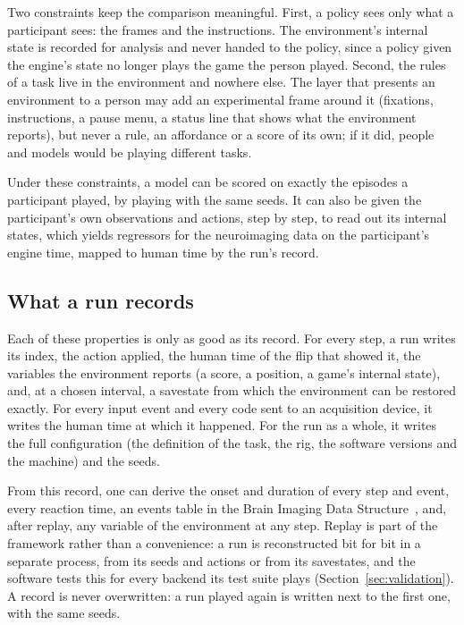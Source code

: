 Two constraints keep the comparison meaningful.
First, a policy sees only what a participant sees: the frames and the instructions.
The environment's internal state is recorded for analysis and never handed to the policy, since a policy given the engine's state no longer plays the game the person played.
Second, the rules of a task live in the environment and nowhere else.
The layer that presents an environment to a person may add an experimental frame around it (fixations, instructions, a pause menu, a status line that shows what the environment reports), but never a rule, an affordance or a score of its own; if it did, people and models would be playing different tasks.

Under these constraints, a model can be scored on exactly the episodes a participant played, by playing with the same seeds.
It can also be given the participant's own observations and actions, step by step, to read out its internal states, which yields regressors for the neuroimaging data on the participant's engine time, mapped to human time by the run's record.

\subsection{What a run records}
\label{sec:record}

Each of these properties is only as good as its record.
For every step, a run writes its index, the action applied, the human time of the flip that showed it, the variables the environment reports (a score, a position, a game's internal state), and, at a chosen interval, a savestate from which the environment can be restored exactly.
For every input event and every code sent to an acquisition device, it writes the human time at which it happened.
For the run as a whole, it writes the full configuration (the definition of the task, the rig, the software versions and the machine) and the seeds.

From this record, one can derive the onset and duration of every step and event, every reaction time, an events table in the Brain Imaging Data Structure~\citep{gorgolewski2016bids}, and, after replay, any variable of the environment at any step.
Replay is part of the framework rather than a convenience: a run is reconstructed bit for bit in a separate process, from its seeds and actions or from its savestates, and the software tests this for every backend its test suite plays (Section~\ref{sec:validation}).
A record is never overwritten: a run played again is written next to the first one, with the same seeds.

